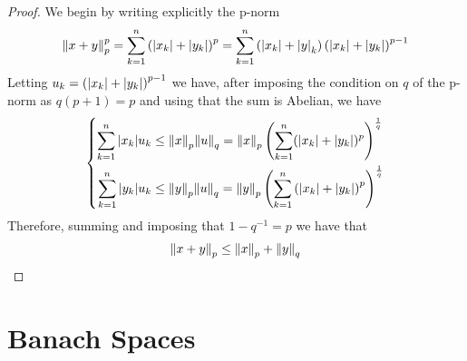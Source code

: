 \documentclass[../complete.tex]{subfiles}
\begin{document}
\begin{proof}
	We begin by writing explicitly the p-norm
	\begin{equation*}
		\norm{x+y}_p^p=\sum_{k=1}^n\left( \abs{x_k}+\abs{y_k} \right)^p=\sum_{k=1}^n\left( \abs{x_k}+\abs{y}_k \right)\left( \abs{x_k}+\abs{y_k} \right)^{p-1}
	\end{equation*}
	Letting $u_k=\left( \abs{x_k}+\abs{y_k} \right)^{p-1}$ we have, after imposing the condition on $q$ of the p-norm as $q(p+1)=p$ and using that the sum is Abelian, we have
	\begin{equation*}
		\left\{\begin{aligned}
				\sum_{k=1}^n\abs{x_k}u_k&\le\norm{x}_p\norm{u}_q=\norm{x}_p\left(\sum_{k=1}^n(\abs{x_k}+\abs{y_k})^p\right)^{\frac{1}{q}}\\
				\sum_{k=1}^n\abs{y_k}u_k&\le\norm{y}_p\norm{u}_q=\norm{y}_p\left( \sum_{k=1}^n\left( \abs{x_k}+\abs{y_k} \right)^p \right)^{\frac{1}{q}}
		\end{aligned}\right.
	\end{equation*}
	Therefore, summing and imposing that $1-q^{-1}=p$ we have that
	\begin{equation*}
		\norm{x+y}_p\le\norm{x}_p+\norm{y}_q
	\end{equation*}
\end{proof}
\section{Banach Spaces}
\end{document}
